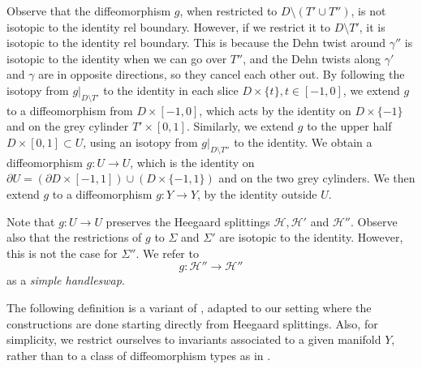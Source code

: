 \documentclass [11pt]{amsart}
\theoremstyle{remark}
\def\del{\partial}
\def\cH{\mathcal{H}}
\begin{document}
Observe that the diffeomorphism $g$, when restricted to $D \setminus (T' \cup T'')$, is not isotopic to the identity rel boundary. However, if we restrict it to $D \setminus T'$, it is isotopic to the identity rel boundary. This is because the Dehn twist around $\gamma''$ is isotopic to the identity when we can go over $T''$, and  the Dehn twists along $\gamma'$ and $\gamma$ are in opposite directions, so they cancel each other  out. By following the isotopy from $g|_{D \setminus T'}$ to the identity in each slice $D \times \{t\}, t \in [-1,0]$, we extend $g$ to a diffeomorphism from $D \times [-1,0]$, which acts by the identity on $D \times \{-1\}$ and on the grey cylinder $T' \times [0,1]$. Similarly, we extend $g$ to the upper half $D \times [0,1] \subset U$, using an isotopy from $g|_{D \setminus T''}$ to the identity. We obtain a diffeomorphism $g: U \to U$, which is the identity on $\del U = (\del D \times [-1,1]) \cup (D \times \{-1,1\})$ and on the two grey cylinders. We then extend $g$ to a diffeomorphism $g:Y \to Y$, by the identity outside $U$. 

Note that $g: U \to U$ preserves the Heegaard splittings $\cH, \cH'$ and $\cH''$. Observe also that the restrictions of $g$ to $\Sigma$ and $\Sigma'$ are isotopic to the identity. However, this is not the case for $\Sigma''$. We refer to 
$$ g: \cH'' \to \cH''$$
as a {\em simple handleswap}. 

The following definition is a variant of \cite[Definition 2.32]{JuhaszThurston}, adapted to our setting where the constructions are done starting directly from Heegaard splittings. Also, for simplicity, we restrict ourselves to invariants associated to a given manifold $Y$, rather than to a class of diffeomorphism types as in  \cite{JuhaszThurston}.
\end{document}
